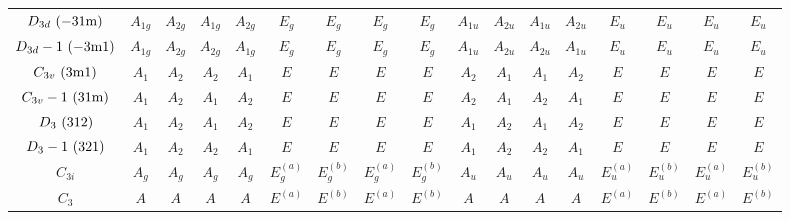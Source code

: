 \documentclass[fleqn,10pt,landscape]{jsarticle}
\begin{document}
\begin{table}[ht!]
\begin{center}
\begin{tabular}{ccccccccccccccccc}
$ D_{3d}\,\, ({\rm -31m}) $ & $ A_{1g} $ & $ A_{2g} $ & $ A_{1g} $ & $ A_{2g} $ & $ E_{g} $ & $ E_{g} $ & $ E_{g} $ & $ E_{g} $ & $ A_{1u} $ & $ A_{2u} $ & $ A_{1u} $ & $ A_{2u} $ & $ E_{u} $ & $ E_{u} $ & $ E_{u} $ & $ E_{u} $ \\
$ D_{3d}-1\,\, ({\rm -3m1}) $ & $ A_{1g} $ & $ A_{2g} $ & $ A_{2g} $ & $ A_{1g} $ & $ E_{g} $ & $ E_{g} $ & $ E_{g} $ & $ E_{g} $ & $ A_{1u} $ & $ A_{2u} $ & $ A_{2u} $ & $ A_{1u} $ & $ E_{u} $ & $ E_{u} $ & $ E_{u} $ & $ E_{u} $ \\
$ C_{3v}\,\, ({\rm 3m1}) $ & $ A_{1} $ & $ A_{2} $ & $ A_{2} $ & $ A_{1} $ & $ E $ & $ E $ & $ E $ & $ E $ & $ A_{2} $ & $ A_{1} $ & $ A_{1} $ & $ A_{2} $ & $ E $ & $ E $ & $ E $ & $ E $ \\
$ C_{3v}-1\,\, ({\rm 31m}) $ & $ A_{1} $ & $ A_{2} $ & $ A_{1} $ & $ A_{2} $ & $ E $ & $ E $ & $ E $ & $ E $ & $ A_{2} $ & $ A_{1} $ & $ A_{2} $ & $ A_{1} $ & $ E $ & $ E $ & $ E $ & $ E $ \\
$ D_{3}\,\, ({\rm 312}) $ & $ A_{1} $ & $ A_{2} $ & $ A_{1} $ & $ A_{2} $ & $ E $ & $ E $ & $ E $ & $ E $ & $ A_{1} $ & $ A_{2} $ & $ A_{1} $ & $ A_{2} $ & $ E $ & $ E $ & $ E $ & $ E $ \\
$ D_{3}-1\,\, ({\rm 321}) $ & $ A_{1} $ & $ A_{2} $ & $ A_{2} $ & $ A_{1} $ & $ E $ & $ E $ & $ E $ & $ E $ & $ A_{1} $ & $ A_{2} $ & $ A_{2} $ & $ A_{1} $ & $ E $ & $ E $ & $ E $ & $ E $ \\
$ C_{3i} $ & $ A_{g} $ & $ A_{g} $ & $ A_{g} $ & $ A_{g} $ & $ E_{g}^{(a)} $ & $ E_{g}^{(b)} $ & $ E_{g}^{(a)} $ & $ E_{g}^{(b)} $ & $ A_{u} $ & $ A_{u} $ & $ A_{u} $ & $ A_{u} $ & $ E_{u}^{(a)} $ & $ E_{u}^{(b)} $ & $ E_{u}^{(a)} $ & $ E_{u}^{(b)} $ \\
$ C_{3} $ & $ A $ & $ A $ & $ A $ & $ A $ & $ E^{(a)} $ & $ E^{(b)} $ & $ E^{(a)} $ & $ E^{(b)} $ & $ A $ & $ A $ & $ A $ & $ A $ & $ E^{(a)} $ & $ E^{(b)} $ & $ E^{(a)} $ & $ E^{(b)} $ \\
 \hline \hline
\end{tabular}
\end{center}
\end{table}
\end{document}
